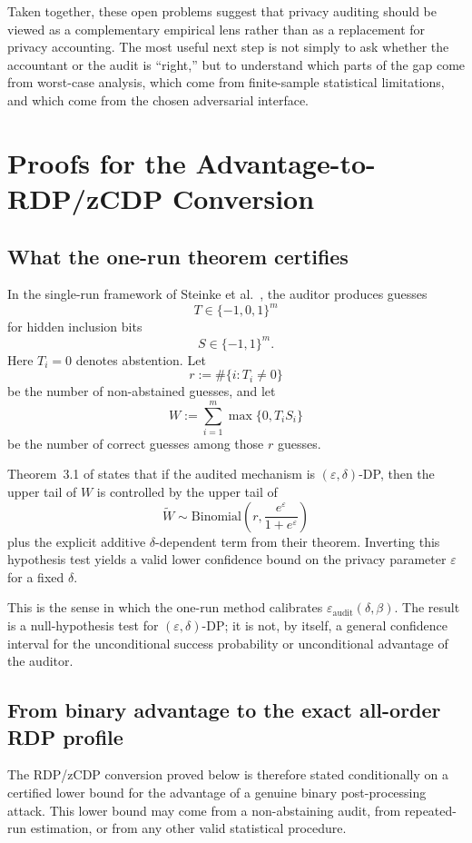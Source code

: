 \documentclass[10pt]{article}
\newcommand{\eps}{\varepsilon}
\newcommand{\del}{\delta}
\newcommand{\Bin}{\mathrm{Binomial}}
\begin{document}
Taken together, these open problems suggest that privacy auditing should be viewed as a complementary empirical lens rather than as a replacement for privacy accounting. The most useful next step is not simply to ask whether the accountant or the audit is ``right,'' but to understand which parts of the gap come from worst-case analysis, which come from finite-sample statistical limitations, and which come from the chosen adversarial interface.

\appendix

\section{Proofs for the Advantage-to-RDP/zCDP Conversion}
\label{app:theory}

\subsection{What the one-run theorem certifies}

In the single-run framework of Steinke et al.~\cite{steinke2023privacy}, the auditor produces guesses
\[
T \in \{-1,0,1\}^m
\]
for hidden inclusion bits
\[
S \in \{-1,1\}^m.
\]
Here $T_i=0$ denotes abstention. Let
\[
r := \#\{i : T_i \neq 0\}
\]
be the number of non-abstained guesses, and let
\[
W:=\sum_{i=1}^m \max\{0,T_iS_i\}
\]
be the number of correct guesses among those $r$ guesses.

Theorem~3.1 of \cite{steinke2023privacy} states that if the audited mechanism is $(\eps,\del)$-DP, then the upper tail of $W$ is controlled by the upper tail of
\[
\widetilde W \sim \Bin\!\left(r,\frac{e^\eps}{1+e^\eps}\right)
\]
plus the explicit additive $\del$-dependent term from their theorem. Inverting this hypothesis test yields a valid lower confidence bound on the privacy parameter $\eps$ for a fixed $\del$.

This is the sense in which the one-run method calibrates $\eps_{\mathrm{audit}}(\del,\beta)$. The result is a null-hypothesis test for $(\eps,\del)$-DP; it is not, by itself, a general confidence interval for the unconditional success probability or unconditional advantage of the auditor.

\subsection{From binary advantage to the exact all-order RDP profile}

The RDP/zCDP conversion proved below is therefore stated conditionally on a certified lower bound for the advantage of a genuine binary post-processing attack. This lower bound may come from a non-abstaining audit, from repeated-run estimation, or from any other valid statistical procedure.
\end{document}
